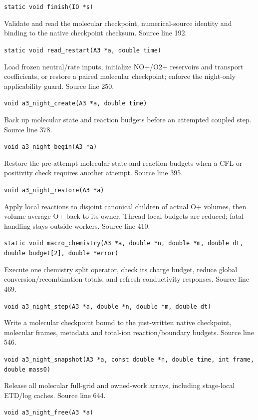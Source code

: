 \begin{description}[style=nextline,leftmargin=0pt,labelindent=0pt,labelwidth=0pt,labelsep=0pt]
{\small\nolinkurl{static void finish(IO *s)}}
\item[\texttt{read\_restart}] Validate and read the molecular checkpoint, numerical-source identity and binding to the native checkpoint checksum. Source line 192.\par
{\small\nolinkurl{static void read_restart(A3 *a, double time)}}
\item[\texttt{a3\_night\_create}] Load frozen neutral/rate inputs, initialize NO+/O2+ reservoirs and transport coefficients, or restore a paired molecular checkpoint; enforce the night-only applicability guard. Source line 250.\par
{\small\nolinkurl{void a3_night_create(A3 *a, double time)}}
\item[\texttt{a3\_night\_begin}] Back up molecular state and reaction budgets before an attempted coupled step. Source line 378.\par
{\small\nolinkurl{void a3_night_begin(A3 *a)}}
\item[\texttt{a3\_night\_restore}] Restore the pre-attempt molecular state and reaction budgets when a CFL or positivity check requires another attempt. Source line 395.\par
{\small\nolinkurl{void a3_night_restore(A3 *a)}}
\item[\texttt{macro\_chemistry}] Apply local reactions to disjoint canonical children of actual O+ volumes, then volume-average O+ back to its owner. Thread-local budgets are reduced; fatal handling stays outside workers. Source line 410.\par
{\small\nolinkurl{static void macro_chemistry(A3 *a, double *n, double *m, double dt, double budget[2], double *error)}}
\item[\texttt{a3\_night\_step}] Execute one chemistry split operator, check its charge budget, reduce global conversion/recombination totals, and refresh conductivity responses. Source line 469.\par
{\small\nolinkurl{void a3_night_step(A3 *a, double *n, double *m, double dt)}}
\item[\texttt{a3\_night\_snapshot}] Write a molecular checkpoint bound to the just-written native checkpoint, molecular frames, metadata and total-ion reaction/boundary budgets. Source line 546.\par
{\small\nolinkurl{void a3_night_snapshot(A3 *a, const double *n, double time, int frame, double mass0)}}
\item[\texttt{a3\_night\_free}] Release all molecular full-grid and owned-work arrays, including stage-local ETD/log caches. Source line 644.\par
{\small\nolinkurl{void a3_night_free(A3 *a)}}
\end{description}
